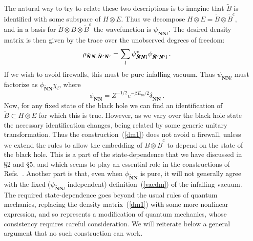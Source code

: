 \documentclass[12pt]{article}
\newcommand{\be}{\begin{equation}}
\newcommand{\ee}{\end{equation}}
\begin{document}
{The natural way to try to relate these two descriptions is to imagine that $\tilde B$ is identified with some subspace of $H \otimes E$.  Thus we decompose $H \otimes E = \tilde B \otimes \tilde B^c$, and in a basis for $\tilde B \otimes B \otimes \tilde B^c$ the wavefunction is
$
\psi_{\tilde{\pmb N}\pmb N l} .
$
The desired density matrix is then given by the trace over the unobserved degrees of freedom:
\be
\rho_{\tilde{\pmb N} \pmb N,\tilde{\pmb N}{}' \pmb N'} = \sum_l  \psi^*_{\tilde{\pmb N} \pmb Nl}  \psi^{\vphantom{*}}_{\tilde{\pmb N}{}'\pmb N'l} \,.  \label{dm1}
\ee
If we wish to avoid firewalls, this must be pure infalling vacuum.  Thus $\psi_{\tilde{\pmb N} \pmb Nl}$ must factorize as $\phi_{\tilde{\pmb N} \pmb N} \chi_l$, where
\be
\phi_{\tilde{\pmb N} \pmb N} = Z^{-1/2} e^{-\beta E_{\pmb N}{/2}} \delta_{\tilde{\pmb N} \pmb N} \,.  \label{vacdm}
\ee
Now, for {any fixed state of the black hole we can find an identification of $\tilde B \subset H \otimes E$ for which this is true.  However, as we vary over the black hole state the necessary identification changes, being related by some generic unitary transformation.}  Thus the construction~(\ref{dm1}) does not avoid a firewall, unless we extend the rules to allow the embedding of $B \otimes \tilde B^c$ to depend on the state of the black hole.  This is a part of the state-dependence that we have discussed in \S2 and \S5, and which seems to play an essential role in the constructions of Refs.~\cite{Papadodimas:2012aq,Verlinde:2012cy}. Another part is that, even when $\phi_{\tilde{\pmb N} \pmb N}$ is pure, it will not generally agree with the fixed ($\psi_{\tilde{\pmb N} \pmb Nl}$-independent) definition~(\ref{vacdm}) of the infalling vacuum.
The required state-dependence goes beyond the usual rules of quantum mechanics, replacing the density matrix~(\ref{dm1}) with some more nonlinear expression, and so represents a modification of quantum mechanics, whose consistency requires careful consideration.  We will reiterate below a general argument that no such construction can work.

}
\end{document}
